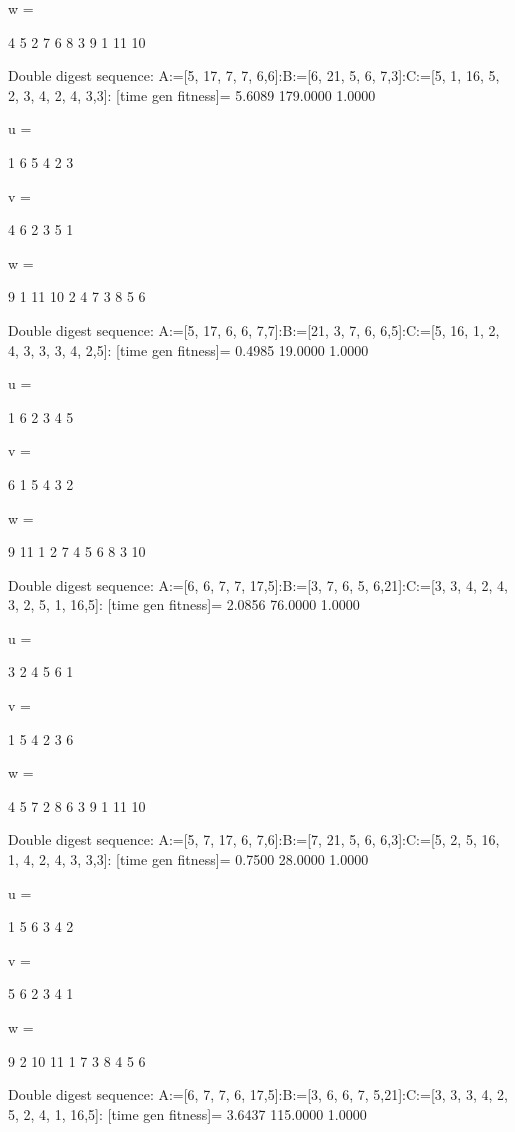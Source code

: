 w =

     4     5     2     7     6     8     3     9     1    11    10

Double digest sequence:
A:=[5, 17, 7, 7, 6,6]:B:=[6, 21, 5, 6, 7,3]:C:=[5, 1, 16, 5, 2, 3, 4, 2, 4, 3,3]:
[time gen fitness]=
    5.6089  179.0000    1.0000


u =

     1     6     5     4     2     3


v =

     4     6     2     3     5     1


w =

     9     1    11    10     2     4     7     3     8     5     6

Double digest sequence:
A:=[5, 17, 6, 6, 7,7]:B:=[21, 3, 7, 6, 6,5]:C:=[5, 16, 1, 2, 4, 3, 3, 3, 4, 2,5]:
[time gen fitness]=
    0.4985   19.0000    1.0000


u =

     1     6     2     3     4     5


v =

     6     1     5     4     3     2


w =

     9    11     1     2     7     4     5     6     8     3    10

Double digest sequence:
A:=[6, 6, 7, 7, 17,5]:B:=[3, 7, 6, 5, 6,21]:C:=[3, 3, 4, 2, 4, 3, 2, 5, 1, 16,5]:
[time gen fitness]=
    2.0856   76.0000    1.0000


u =

     3     2     4     5     6     1


v =

     1     5     4     2     3     6


w =

     4     5     7     2     8     6     3     9     1    11    10

Double digest sequence:
A:=[5, 7, 17, 6, 7,6]:B:=[7, 21, 5, 6, 6,3]:C:=[5, 2, 5, 16, 1, 4, 2, 4, 3, 3,3]:
[time gen fitness]=
    0.7500   28.0000    1.0000


u =

     1     5     6     3     4     2


v =

     5     6     2     3     4     1


w =

     9     2    10    11     1     7     3     8     4     5     6

Double digest sequence:
A:=[6, 7, 7, 6, 17,5]:B:=[3, 6, 6, 7, 5,21]:C:=[3, 3, 3, 4, 2, 5, 2, 4, 1, 16,5]:
[time gen fitness]=
    3.6437  115.0000    1.0000


